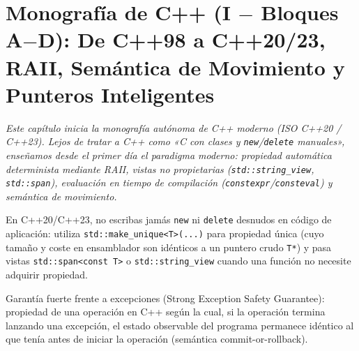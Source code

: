 \documentclass{book}
\begin{document}
\chapter{Monografía de C++ (I \(-\) Bloques A\(-\)D): De C++98 a C++20/23, RAII, Semántica de Movimiento y Punteros Inteligentes}
\label{chap:cap04-cpp-fundamentos-raii-move-semantics-smart-pointers}

\noindent\textit{Este capítulo inicia la monografía autónoma de C++ moderno (ISO C++20 / C++23). Lejos de tratar a C++ como «C con clases y \texttt{new}/\texttt{delete} manuales», enseñamos desde el primer día el paradigma moderno: propiedad automática determinista mediante RAII, vistas no propietarias (\texttt{std::string\_view}, \texttt{std::span}), evaluación en tiempo de compilación (\texttt{constexpr}/\texttt{consteval}) y semántica de movimiento.}

\begin{tcolorbox}[title={Consejo}, studiumtip, breakable]

En C++20/C++23, no escribas jamás \texttt{new} ni \texttt{delete} desnudos en código de aplicación: utiliza \texttt{std::make\_unique<T>(...)} para propiedad única (cuyo tamaño y coste en ensamblador son idénticos a un puntero crudo \texttt{T*}) y pasa vistas \texttt{std::span<const T>} o \texttt{std::string\_view} cuando una función no necesite adquirir propiedad.
\end{tcolorbox}

\begin{tcolorbox}[title={Definición}, studiumdef, breakable]

Garantía fuerte frente a excepciones (Strong Exception Safety Guarantee): propiedad de una operación en C++ según la cual, si la operación termina lanzando una excepción, el estado observable del programa permanece idéntico al que tenía antes de iniciar la operación (semántica commit-or-rollback).
\end{tcolorbox}
\end{document}
